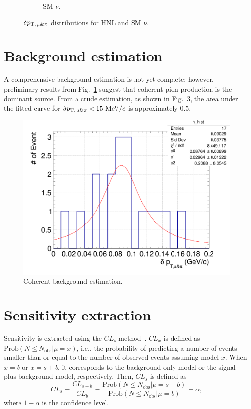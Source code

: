 \begin{figure}[!htb]
\begin{subfigure}{0.45\textwidth}
                \caption{SM $\nu$.}
                \label{fig:sm-mupidpt}
           \end{subfigure}
           \caption{$\delta p_{\textrm{T},\,\mu\&\pi}$ distributions for HNL and SM $\nu$.}
           \label{fig:mmupi-dpt}
        \end{figure}

    
    \section{Background estimation}
        A comprehensive background estimation is not yet complete; however, preliminary results from Fig.~\ref{fig:sm-mupidpt} suggest that coherent pion production is the dominant source. 
        From a crude estimation, as shown in Fig.~\ref{fig:coh-bkg}, the area under the fitted curve for $\delta p_{\textrm{T},\,\mu\&\pi}<15~\textrm{MeV}/c$ is approximately $0.5$. 
        \begin{figure}[!htb] 
            \centering
            \includegraphics[width=0.5\linewidth]{figures/COH.png}
            \caption{Coherent background estimation. }
            \label{fig:coh-bkg}
        \end{figure}    
    
    \section{Sensitivity extraction}
        Sensitivity is extracted using the $CL_s$ method~\cite{Read:2002hq}.
        $CL_x$ is defined as $\textrm{Prob}(N\leq N_{\textrm{obs}}| \mu = x)$, i.e., the probability of predicting a number of events smaller than or equal to the number of observed events assuming model $x$. When $x=b$ or $x=s+b$, it corresponds to the background-only model or the signal plus background model, respectively.
        Then, $CL_s$ is defined as 
        \begin{equation}
            CL_s = \frac{CL_{s+b}}{CL_{b}} = \frac{\textrm{Prob}(N\leq N_{\textrm{obs}}| \mu = s+b)}{\textrm{Prob}(N\leq N_{\textrm{obs}}| \mu = b)} = \alpha,
        \end{equation}
        where $1-\alpha$ is the confidence level.

